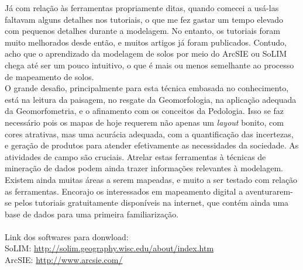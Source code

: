 Já com relação às ferramentas propriamente ditas, quando comecei a usá-las faltavam alguns detalhes nos tutoriais, o que me fez gastar um tempo elevado com pequenos detalhes durante a modelagem. No entanto, os tutoriais foram muito melhorados desde então, e muitos artigos já foram publicados. Contudo, acho que o aprendizado da modelagem de solos por meio do ArcSIE ou SoLIM chega até ser um pouco intuitivo, o que é mais ou menos semelhante ao processo de mapeamento de solos.\\
O grande desafio, principalmente para esta técnica embasada no conhecimento, está na leitura da paisagem, no resgate da Geomorfologia, na aplicação adequada da Geomorfometria, e o afinamento com os conceitos da Pedologia. Isso se faz necessário pois os mapas de hoje requerem não apenas um \emph{layout} bonito, com cores atrativas, mas uma acurácia adequada, com a quantificação das incertezas, e geração de produtos para atender efetivamente as necessidades da sociedade. As atividades de campo são cruciais. Atrelar estas ferramentas à técnicas de mineração de dados podem ainda trazer informações relevantes à modelagem.\\
Existem ainda muitas áreas a serem mapeadas, e muito a ser testado com relação as ferramentas. Encorajo os interessados em mapeamento digital a aventurarem-se pelos tutoriais gratuitamente disponíveis na internet, que contém ainda uma base de dados para uma primeira familiarização.\\
\\
Link dos softwares para donwload:\\
SoLIM: \url{http://solim.geography.wisc.edu/about/index.htm}\\
ArcSIE: \url{http://www.arcsie.com/}\\
\\
\address{Michele Duarte de Menezes\\
  Universidade Federal Rural do Rio de Janeiro\\
  }


